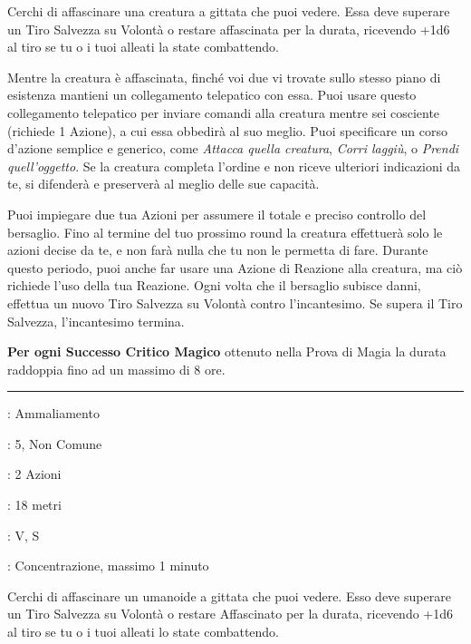 \begin{multicols}{2}
Cerchi di affascinare una creatura a gittata che puoi vedere. Essa deve superare un Tiro Salvezza su Volontà o restare affascinata per la durata, ricevendo +1d6 al tiro se tu o i tuoi alleati la state combattendo.

Mentre la creatura è affascinata, finché voi due vi trovate sullo stesso piano di esistenza mantieni un collegamento telepatico con essa. Puoi usare questo collegamento telepatico per inviare comandi alla creatura mentre sei cosciente (richiede 1 Azione), a cui essa obbedirà al suo meglio. Puoi specificare un corso d'azione semplice e generico, come \emph{Attacca quella creatura}, \emph{Corri laggiù}, o \emph{Prendi quell'oggetto}. Se la creatura completa l'ordine e non riceve ulteriori indicazioni da te, si difenderà e preserverà al meglio delle sue capacità.

Puoi impiegare due tua Azioni per assumere il totale e preciso controllo del bersaglio. Fino al termine del tuo prossimo round la creatura effettuerà solo le azioni decise da te, e non farà nulla che tu non le permetta di fare. Durante questo periodo, puoi anche far usare una Azione di Reazione alla creatura, ma ciò richiede l'uso della tua Reazione. Ogni volta che il bersaglio subisce danni, effettua un nuovo Tiro Salvezza su Volontà contro l'incantesimo. Se supera il Tiro Salvezza, l'incantesimo termina.

\textbf{Per ogni Successo Critico Magico} ottenuto nella Prova di Magia la durata raddoppia fino ad un massimo di 8 ore.

\smallskip\noindent\rule{\linewidth}{2pt} \hypertarget{Dominare Persone}{}\smallskip{}
\noindent
\begin{description}[noitemsep, topsep=0pt, parsep=0pt, partopsep=0pt, leftmargin=0cm, labelwidth=2.8cm]
	\item[\textbf{Lista di Magia}]: Ammaliamento
	\item[\textbf{Livello}]: 5, Non Comune
	\item[\textbf{T. di Lancio}]: 2 Azioni
	\item[\textbf{Gittata}]: 18 metri
	\item[\textbf{Componenti}]: V, S
	\item[\textbf{Durata}]: Concentrazione, massimo 1 minuto
\end{description}

Cerchi di affascinare un umanoide a gittata che puoi vedere. Esso deve superare un Tiro Salvezza su Volontà o restare Affascinato per la durata, ricevendo +1d6 al tiro se tu o i tuoi alleati lo state combattendo.


\end{multicols}
